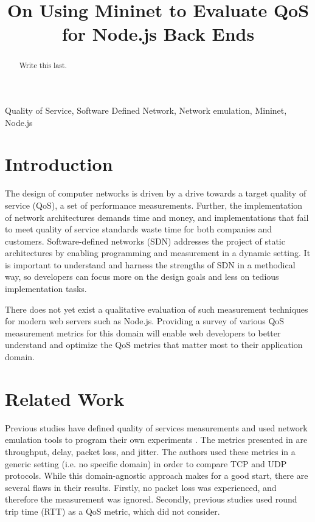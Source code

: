 \documentclass{article}
\title{On Using Mininet to Evaluate QoS for Node.js Back Ends}
\begin{document}
%
\maketitle
%
\begin{abstract}
Write this last.
\end{abstract}
%
\begin{keywords}
Quality of Service, Software Defined Network, Network emulation, Mininet, Node.js
\end{keywords}
%
\section{Introduction}
The design of computer networks is driven by a drive towards a target quality of service (QoS), a set of performance measurements. Further, the implementation of 
network architectures demands time and money, and implementations that fail to meet quality of service standards waste time for both companies and customers. 
Software-defined networks (SDN) addresses the project of static architectures by enabling programming and measurement in a dynamic setting. It is important to understand 
and harness the strengths of SDN in a methodical way, so developers can focus more on the design goals and less on tedious implementation tasks. 

There does not yet exist a qualitative evaluation of such measurement techniques for modern web servers such as Node.js. Providing a survey of various QoS measurement 
metrics for this domain will enable web developers to better understand and optimize the QoS metrics that matter most to their application domain.

\section{Related Work}
Previous studies have defined quality of services measurements \cite{qos_analysis_2022} and used network emulation tools to program their own experiments 
\cite{chauhan_atulkar_2020}. The metrics presented in \cite{qos_analysis_2022} are throughput, delay, packet loss, and jitter. The authors used these metrics in a 
generic setting (i.e. no specific domain) in order to compare TCP and UDP protocols. While this domain-agnostic approach makes for a good start, there are several 
flaws in their results. Firstly, no packet loss was experienced, and therefore the measurement was ignored. Secondly, previous studies used round trip time (RTT) 
as a QoS metric, which \cite{qos_analysis_2022} did not consider. 
\end{document}
